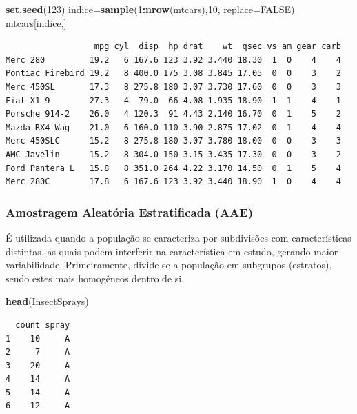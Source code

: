 \documentclass[12pt,brazil,oneside]{book}
\newenvironment{Shaded}{\begin{snugshade}}{\end{snugshade}}
\newcommand{\DataTypeTok}[1]{\textcolor[rgb]{0.13,0.29,0.53}{#1}}
\newcommand{\DecValTok}[1]{\textcolor[rgb]{0.00,0.00,0.81}{#1}}
\newcommand{\KeywordTok}[1]{\textcolor[rgb]{0.13,0.29,0.53}{\textbf{#1}}}
\newcommand{\NormalTok}[1]{#1}
\newcommand{\OperatorTok}[1]{\textcolor[rgb]{0.81,0.36,0.00}{\textbf{#1}}}
\newcommand{\OtherTok}[1]{\textcolor[rgb]{0.56,0.35,0.01}{#1}}
\begin{document}
\begin{Shaded}
\begin{Highlighting}[]
\KeywordTok{set.seed}\NormalTok{(}\DecValTok{123}\NormalTok{)}
\NormalTok{indice=}\KeywordTok{sample}\NormalTok{(}\DecValTok{1}\OperatorTok{:}\KeywordTok{nrow}\NormalTok{(mtcars),}\DecValTok{10}\NormalTok{, }\DataTypeTok{replace=}\OtherTok{FALSE}\NormalTok{)}
\NormalTok{mtcars[indice,]}
\end{Highlighting}
\end{Shaded}

\begin{verbatim}
                  mpg cyl  disp  hp drat    wt  qsec vs am gear carb
Merc 280         19.2   6 167.6 123 3.92 3.440 18.30  1  0    4    4
Pontiac Firebird 19.2   8 400.0 175 3.08 3.845 17.05  0  0    3    2
Merc 450SL       17.3   8 275.8 180 3.07 3.730 17.60  0  0    3    3
Fiat X1-9        27.3   4  79.0  66 4.08 1.935 18.90  1  1    4    1
Porsche 914-2    26.0   4 120.3  91 4.43 2.140 16.70  0  1    5    2
Mazda RX4 Wag    21.0   6 160.0 110 3.90 2.875 17.02  0  1    4    4
Merc 450SLC      15.2   8 275.8 180 3.07 3.780 18.00  0  0    3    3
AMC Javelin      15.2   8 304.0 150 3.15 3.435 17.30  0  0    3    2
Ford Pantera L   15.8   8 351.0 264 4.22 3.170 14.50  0  1    5    4
Merc 280C        17.8   6 167.6 123 3.92 3.440 18.90  1  0    4    4
\end{verbatim}

\hypertarget{amostragem-aleatoria-estratificada-aae}{%
\subsubsection{Amostragem Aleatória Estratificada (AAE)}\label{amostragem-aleatoria-estratificada-aae}}

É utilizada quando a população se caracteriza por subdivisões com características distintas, as
quais podem interferir na característica em estudo, gerando maior variabilidade. Primeiramente, divide-se a
população em subgrupos (estratos), sendo estes mais homogêneos dentro de si.

\begin{Shaded}
\begin{Highlighting}[]
\KeywordTok{head}\NormalTok{(InsectSprays)}
\end{Highlighting}
\end{Shaded}

\begin{verbatim}
  count spray
1    10     A
2     7     A
3    20     A
4    14     A
5    14     A
6    12     A
\end{verbatim}
\end{document}
